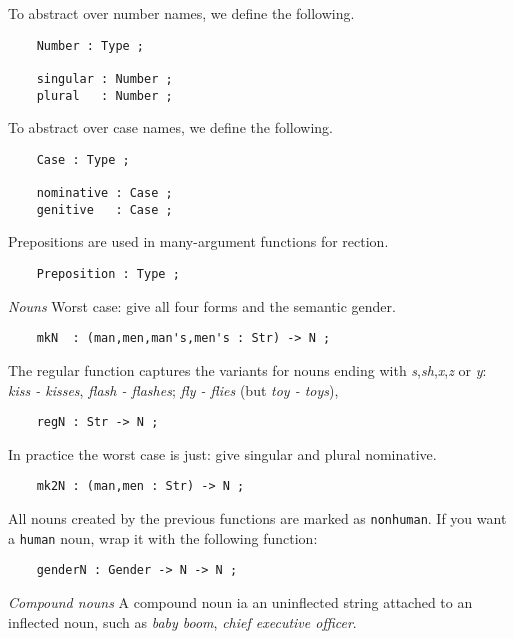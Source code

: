 \documentclass[11pt,a4paper]{article}
\newcommand{\subsubsubsection}[1]{\textit{#1}}
\begin{document}
To abstract over number names, we define the following.

\begin{verbatim}
    Number : Type ; 
  
    singular : Number ;
    plural   : Number ;
\end{verbatim}

To abstract over case names, we define the following.

\begin{verbatim}
    Case : Type ;
  
    nominative : Case ;
    genitive   : Case ;
\end{verbatim}

Prepositions are used in many-argument functions for rection.

\begin{verbatim}
    Preposition : Type ;
\end{verbatim}

\subsubsubsection{Nouns}
Worst case: give all four forms and the semantic gender.

\begin{verbatim}
    mkN  : (man,men,man's,men's : Str) -> N ;
\end{verbatim}

The regular function captures the variants for nouns ending with
\textit{s},\textit{sh},\textit{x},\textit{z} or \textit{y}: \textit{kiss - kisses}, \textit{flash - flashes}; 
\textit{fly - flies} (but \textit{toy - toys}),

\begin{verbatim}
    regN : Str -> N ;
\end{verbatim}

In practice the worst case is just: give singular and plural nominative.

\begin{verbatim}
    mk2N : (man,men : Str) -> N ;
\end{verbatim}

All nouns created by the previous functions are marked as
\texttt{nonhuman}. If you want a \texttt{human} noun, wrap it with the following
function:

\begin{verbatim}
    genderN : Gender -> N -> N ;
\end{verbatim}

\subsubsubsection{Compound nouns}
A compound noun ia an uninflected string attached to an inflected noun,
such as \textit{baby boom}, \textit{chief executive officer}.
\end{document}
